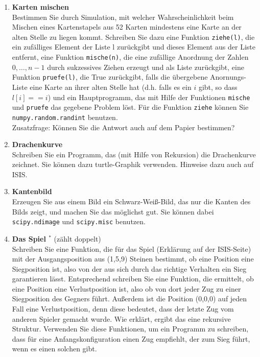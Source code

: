 \begin{enumerate}[1.]
\item \textbf{Karten mischen}\\
 Bestimmen Sie durch Simulation, mit welcher Wahrscheinlichkeit beim Mischen 
eines Kartenstapels aus 52 Karten mindestens eine Karte an der alten Stelle zu liegen
kommt. Schreiben Sie dazu eine Funktion  \texttt{ziehe(l)}, die ein zufälliges Element 
der Liste l zurückgibt und dieses Element aus der Liste entfernt, eine Funktion \texttt{mische(n)},
die eine zufällige Anordnung der Zahlen $0,\ldots,n-1$ durch sukzessives Ziehen erzeugt und als Liste zurückgibt,
eine Funktion \texttt{pruefe(l)}, die True zurückgibt, falls die übergebene Anornungs-Liste eine Karte an ihrer 
alten Stelle hat (d.h. falls es ein $i$ gibt, so dass $l[i]==i$) und ein Hauptprogramm, das mit
Hilfe der Funktionen \texttt{mische} und \texttt{pruefe} das gegebene Problem löst. Für die Funktion
\texttt{ziehe} können Sie \texttt{numpy.random.randint} benutzen.\\
Zusatzfrage: Können Sie die Antwort auch auf dem Papier bestimmen?


\item \textbf{Drachenkurve}\\
Schreiben Sie ein Programm, das (mit Hilfe von Rekursion) die 
Drachenkurve zeichnet. Sie können dazu turtle-Graphik verwenden. Hinweise dazu auch auf ISIS.


\item \textbf{Kantenbild}\\
Erzeugen Sie aus einem Bild ein Schwarz-Weiß-Bild, das nur die Kanten des Bilds 
zeigt, und machen Sie das möglichst gut. Sie können dabei \texttt{scipy.ndimage}
und \texttt{scipy.misc} benutzen.


\item \textbf{Das Spiel $^*$} (zählt doppelt)\\
Schreiben Sie eine Funktion, die für das Spiel (Erklärung auf der ISIS-Seite)
mit der Ausgangsposition aus
(1,5,9) Steinen bestimmt, ob eine Position eine Siegposition ist, 
also von der aus sich durch das richtige Verhalten ein Sieg garantieren
lässt. Entsprechend schreiben Sie eine Funktion, die ermittelt,
ob eine Position eine Verlustposition ist, also ob von dort jeder 
Zug zu einer Siegposition des Gegners führt.  Außerdem ist die Position 
(0,0,0) auf jeden Fall eine Verlustposition, denn diese bedeutet,
dass der letzte Zug vom anderen Spieler gemacht wurde.
Wie erklärt, ergibt das eine rekursive Struktur.
Verwenden Sie diese Funktionen, um ein Programm zu schreiben,
dass für eine Anfangskonfiguration einen Zug empfiehlt, der zum
Sieg führt, wenn es einen solchen gibt.


\end{enumerate}
